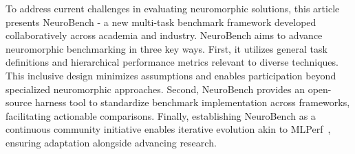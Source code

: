     

To address current challenges in evaluating neuromorphic solutions, this article presents NeuroBench - a new multi-task benchmark framework developed collaboratively across academia and industry. NeuroBench aims to advance neuromorphic benchmarking in three key ways. First, it utilizes general task definitions and hierarchical performance metrics relevant to diverse techniques. This inclusive design minimizes assumptions and enables participation beyond specialized neuromorphic approaches. Second, NeuroBench provides an open-source harness tool to standardize benchmark implementation across frameworks, facilitating actionable comparisons. Finally, establishing NeuroBench as a continuous community initiative enables iterative evolution akin to MLPerf~\cite{Reddi2020,mattson2020mlperf}, ensuring adaptation alongside advancing research.

